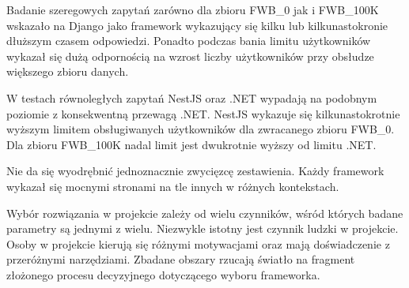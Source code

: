 Badanie szeregowych zapytań zarówno dla zbioru FWB\_0 jak i FWB\_100K wskazało na Django jako framework wykazujący się kilku lub kilkunastokronie dłuższym czasem odpowiedzi.
Ponadto podczas bania limitu użytkowników wykazał się dużą odpornością na wzrost liczby użytkowników przy obsłudze większego zbioru danych.

W testach równoległych zapytań NestJS oraz .NET wypadają na podobnym poziomie z konsekwentną przewagą .NET.
NestJS wykazuje się kilkunastokrotnie wyższym limitem obsługiwanych użytkowników dla zwracanego zbioru FWB\_0.
Dla zbioru FWB\_100K nadal limit jest dwukrotnie wyższy od limitu .NET.

Nie da się wyodrębnić jednoznacznie zwycięzcę zestawienia.
Każdy framework wykazał się mocnymi stronami na tle innych w różnych kontekstach.

Wybór rozwiązania w projekcie zależy od wielu czynników, wśród których badane parametry są jednymi z wielu.
Niezwykle istotny jest czynnik ludzki w projekcie.
Osoby w projekcie kierują się różnymi motywacjami oraz mają doświadczenie z przeróżnymi narzędziami.
Zbadane obszary rzucają światło na fragment złożonego procesu decyzyjnego dotyczącego wyboru frameworka.